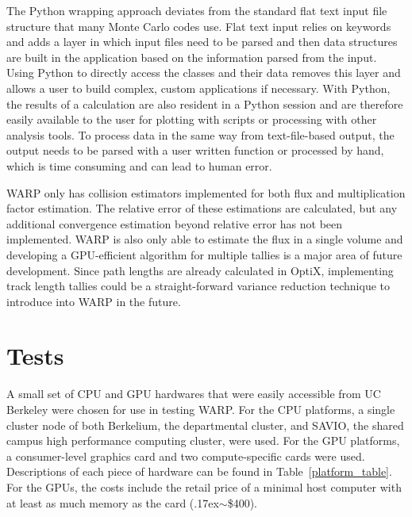 \documentclass[preprint,12pt]{elsarticle}
\begin{document}
The Python wrapping approach deviates from the standard flat text input file structure that many Monte Carlo codes use.  Flat text input relies on keywords and adds a layer in which input files need to be parsed and then data structures are built in the application based on the information parsed from the input.  Using Python to directly access the classes and their data removes this layer and allows a user to build complex, custom applications if necessary.  With Python, the results of a calculation are also resident in a Python session and are therefore easily available to the user for plotting with scripts or processing with other analysis tools.  To process data in the same way from text-file-based output, the output needs to be parsed with a user written function or processed by hand, which is time consuming and can lead to human error.

WARP only has collision estimators implemented for both flux and multiplication factor estimation.  The relative error of these estimations are calculated, but any additional convergence estimation beyond relative error has not been implemented.  WARP is also only able to estimate the flux in a single volume and developing a GPU-efficient algorithm for multiple tallies is a major area of future development.  Since path lengths are already calculated in OptiX, implementing track length tallies could be a straight-forward variance reduction technique to introduce into WARP in the future.



\section{Tests}
\label{sec:tests}

A small set of CPU and GPU hardwares that were easily accessible from UC Berkeley were chosen for use in testing WARP.  For the CPU platforms, a single cluster node of both Berkelium, the departmental cluster, and SAVIO, the shared campus high performance computing cluster, were used.  For the GPU platforms, a consumer-level graphics card and two compute-specific cards were used.  Descriptions of each piece of hardware can be found in Table~\ref{platform_table}. For the GPUs, the costs include the retail price of a minimal host computer with at least as much memory as the card ({\raise.17ex\hbox{$\scriptstyle\sim$}}\$400).
\end{document}
